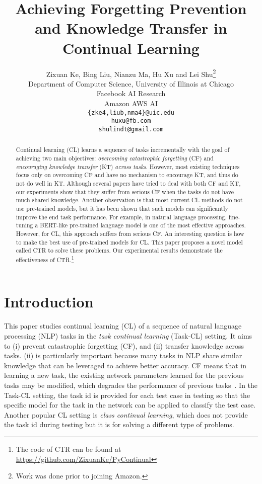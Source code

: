\documentclass{article}
\title{{\color{black}Achieving Forgetting Prevention and Knowledge Transfer in Continual Learning}}
\author{
Zixuan Ke, Bing Liu, Nianzu Ma, Hu Xu and Lei Shu\thanks{Work was done prior to joining Amazon.} \\ 
Department of Computer Science, University of Illinois at Chicago\\
Facebook AI Research\\
Amazon AWS AI\\
\texttt{\{zke4,liub,nma4\}@uic.edu}\\  \texttt{huxu@fb.com} \\ \texttt{shulindt@gmail.com}
}
\begin{document}
\maketitle
\begin{abstract}
{\color{black}Continual learning (CL) learns a sequence of tasks incrementally with the goal of achieving two main objectives: \textit{overcoming catastrophic forgetting} (CF) and \textit{encouraging knowledge transfer} (KT) \textit{across tasks}. However, most existing techniques focus only on overcoming CF and have no mechanism to encourage KT, and thus do not do well in KT. {\color{black}Although several papers have tried to deal with both CF and KT,} our experiments show that they suffer from serious CF when the tasks do not have much shared knowledge. {\color{black}Another observation is that most current CL methods do not use pre-trained models,} {\color{black}but it has been shown that such models can significantly improve the end task performance. For example, in natural language processing,  fine-tuning a BERT-like pre-trained language model is one of the most effective approaches. However, for CL, this approach suffers from serious CF. An interesting question is how to make the best use of pre-trained models for CL. This paper proposes a novel model called CTR to solve these problems.} Our experimental results demonstrate the effectiveness of CTR.}\footnote{The code of CTR can be found at \url{https://github.com/ZixuanKe/PyContinual}} 




\end{abstract}












\section{Introduction}
\label{sec.intro}

This paper studies continual learning (CL) of a sequence of natural language processing (NLP) tasks in the \textit{task continual learning} (Task-CL) setting. {\color{black}It aims to (i) prevent catastrophic forgetting (CF), and  (ii) transfer knowledge across tasks.} (ii) is particularly important because many tasks in NLP share similar knowledge that can be leveraged to achieve better accuracy. CF means that in learning a new task, the existing network parameters learned for the previous tasks may be modified, which degrades the performance of previous tasks~\cite{mccloskey1989catastrophic}. In the Task-CL setting, the task id is provided for each test case in testing so that the specific model for the task in the network can be applied to classify the test case. Another popular CL setting is \textit{class continual learning}, which does not provide the task id during testing but it is for solving a different type of problems. 
\end{document}
